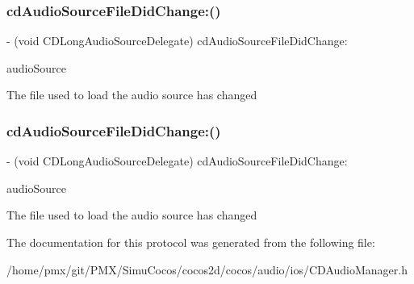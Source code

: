 \subsubsection{\texorpdfstring{cd\+Audio\+Source\+File\+Did\+Change\+:()}{cdAudioSourceFileDidChange:()}\hspace{0.1cm}{\footnotesize\ttfamily [3/4]}}
{\footnotesize\ttfamily -\/ (void C\+D\+Long\+Audio\+Source\+Delegate) cd\+Audio\+Source\+File\+Did\+Change\+: \begin{DoxyParamCaption}\item[{(\hyperlink{interfaceCDLongAudioSource}{C\+D\+Long\+Audio\+Source} $\ast$)}]{audio\+Source }\end{DoxyParamCaption}\hspace{0.3cm}{\ttfamily [optional]}}

The file used to load the audio source has changed \mbox{\label{protocolCDLongAudioSourceDelegate_01-p_a8566afeae5db7aac47e3183aae0f8224}} 
\subsubsection{\texorpdfstring{cd\+Audio\+Source\+File\+Did\+Change\+:()}{cdAudioSourceFileDidChange:()}\hspace{0.1cm}{\footnotesize\ttfamily [4/4]}}
{\footnotesize\ttfamily -\/ (void C\+D\+Long\+Audio\+Source\+Delegate) cd\+Audio\+Source\+File\+Did\+Change\+: \begin{DoxyParamCaption}\item[{(\hyperlink{interfaceCDLongAudioSource}{C\+D\+Long\+Audio\+Source} $\ast$)}]{audio\+Source }\end{DoxyParamCaption}\hspace{0.3cm}{\ttfamily [optional]}}

The file used to load the audio source has changed 

The documentation for this protocol was generated from the following file\+:\begin{DoxyCompactItemize}
\item 
/home/pmx/git/\+P\+M\+X/\+Simu\+Cocos/cocos2d/cocos/audio/ios/C\+D\+Audio\+Manager.\+h\end{DoxyCompactItemize}
